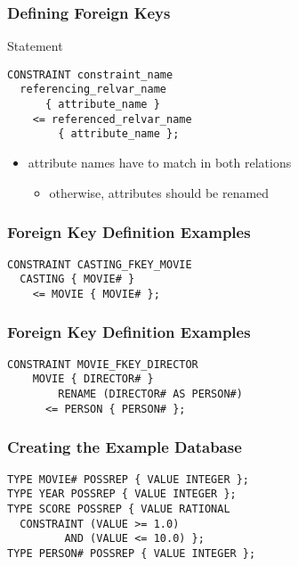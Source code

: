 \documentclass[dvipsnames]{beamer}
\theoremstyle{plain}
\begin{document}
\begin{frame}[fragile]
  \frametitle{Defining Foreign Keys}

  \begin{block}{Statement}
    \begin{lstlisting}
CONSTRAINT constraint_name
  referencing_relvar_name
      { attribute_name }
    <= referenced_relvar_name
        { attribute_name };
    \end{lstlisting}
  \end{block}

  \begin{itemize}
    \item attribute names have to match in both relations
    \begin{itemize}
      \item otherwise, attributes should be renamed
    \end{itemize}
  \end{itemize}
\end{frame}

\begin{frame}[fragile]
  \frametitle{Foreign Key Definition Examples}

  \begin{example}
    \begin{lstlisting}
CONSTRAINT CASTING_FKEY_MOVIE
  CASTING { MOVIE# }
    <= MOVIE { MOVIE# };
    \end{lstlisting}
  \end{example}
\end{frame}

\begin{frame}[fragile]
  \frametitle{Foreign Key Definition Examples}

  \begin{example}
    \begin{lstlisting}
CONSTRAINT MOVIE_FKEY_DIRECTOR
    MOVIE { DIRECTOR# }
        RENAME (DIRECTOR# AS PERSON#)
      <= PERSON { PERSON# };
    \end{lstlisting}
  \end{example}
\end{frame}

\begin{frame}[fragile]
  \frametitle{Creating the Example Database}

  \begin{example}
    \begin{lstlisting}
TYPE MOVIE# POSSREP { VALUE INTEGER };
TYPE YEAR POSSREP { VALUE INTEGER };
TYPE SCORE POSSREP { VALUE RATIONAL
  CONSTRAINT (VALUE >= 1.0)
         AND (VALUE <= 10.0) };
TYPE PERSON# POSSREP { VALUE INTEGER };
    \end{lstlisting}
  \end{example}
\end{frame}
\end{document}
